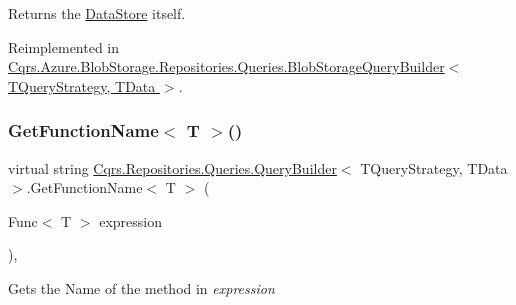 Returns the \hyperlink{classCqrs_1_1Repositories_1_1Queries_1_1QueryBuilder_a8a64851b3bf82ed5d2e708cd39d71890_a8a64851b3bf82ed5d2e708cd39d71890}{Data\+Store} itself. 



Reimplemented in \hyperlink{classCqrs_1_1Azure_1_1BlobStorage_1_1Repositories_1_1Queries_1_1BlobStorageQueryBuilder_a5987844de032c5473714dafcee7f4ae1_a5987844de032c5473714dafcee7f4ae1}{Cqrs.\+Azure.\+Blob\+Storage.\+Repositories.\+Queries.\+Blob\+Storage\+Query\+Builder$<$ T\+Query\+Strategy, T\+Data $>$}.

\mbox{\label{classCqrs_1_1Repositories_1_1Queries_1_1QueryBuilder_a2fce57b724f5443ea75e2f17ae07d401_a2fce57b724f5443ea75e2f17ae07d401}} 
\subsubsection{\texorpdfstring{Get\+Function\+Name$<$ T $>$()}{GetFunctionName< T >()}}
{\footnotesize\ttfamily virtual string \hyperlink{classCqrs_1_1Repositories_1_1Queries_1_1QueryBuilder}{Cqrs.\+Repositories.\+Queries.\+Query\+Builder}$<$ T\+Query\+Strategy, T\+Data $>$.Get\+Function\+Name$<$ T $>$ (\begin{DoxyParamCaption}\item[{Func$<$ T $>$}]{expression }\end{DoxyParamCaption})\hspace{0.3cm}{\ttfamily [protected]}, {\ttfamily [virtual]}}



Gets the Name of the method in {\itshape expression}  

\mbox{\label{classCqrs_1_1Repositories_1_1Queries_1_1QueryBuilder_ace3bdd5bf69a3d56f2e1ec19e75bf2cf_ace3bdd5bf69a3d56f2e1ec19e75bf2cf}} 
